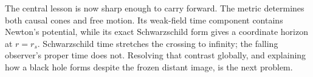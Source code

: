 \begin{classroomqa}
\end{classroomqa}

The central lesson is now sharp enough to carry forward.  The metric
determines both causal cones and free motion.  Its weak-field time component
contains Newton's potential, while its exact Schwarzschild form gives a
coordinate horizon at \(r=r_s\).  Schwarzschild time stretches the crossing
to infinity; the falling observer's proper time does not.  Resolving that
contrast globally, and explaining how a black hole forms despite the frozen
distant image, is the next problem.
